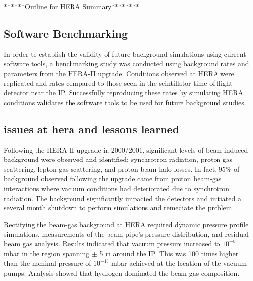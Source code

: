 ******Outline for HERA Summary********

\subsection{Software Benchmarking}

In order to establish the validity of future background simulations using current software tools, a benchmarking study was conducted using background rates and parameters from the HERA-II upgrade.  Conditions observed at HERA were replicated and rates compared to those seen in the scintillator time-of-flight detector near the IP.  Successfully reproducing these rates by simulating HERA conditions validates the software tools to be used for future background studies. 

\subsection{issues at hera and lessons learned}
Following the HERA-II upgrade in 2000/2001, significant levels of beam-induced background were observed and identified: synchrotron radiation, proton gas scattering, lepton gas scattering, and proton beam halo losses.   In fact, 95\% of background observed following the upgrade came from proton beam-gas interactions where vacuum conditions had deteriorated due to synchrotron radiation.  The background significantly impacted the detectors and initiated a several month shutdown to perform simulations and remediate the problem.


Rectifying the beam-gas background at HERA required dynamic pressure profile simulations, measurements of the beam pipe's pressure distribution, and residual beam gas analysis.  Results indicated that vacuum pressure increased to $10^{-8}$ mbar in the region spanning $\pm$ 5 m around the IP.   This  was 100 times higher than the nominal pressure of $10^{-10}$ mbar achieved at the location of the vacuum pumps. Analysis showed that hydrogen dominated the beam gas composition. 



